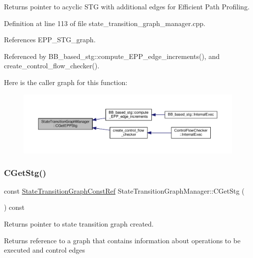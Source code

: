 Returns pointer to acyclic S\+TG with additional edges for Efficient Path Profiling. 



Definition at line 113 of file state\+\_\+transition\+\_\+graph\+\_\+manager.\+cpp.



References E\+P\+P\+\_\+\+S\+T\+G\+\_\+graph.



Referenced by B\+B\+\_\+based\+\_\+stg\+::compute\+\_\+\+E\+P\+P\+\_\+edge\+\_\+increments(), and create\+\_\+control\+\_\+flow\+\_\+checker().

Here is the caller graph for this function\+:
\nopagebreak
\begin{figure}[H]
\begin{center}
\leavevmode
\includegraphics[width=350pt]{d9/dfd/classStateTransitionGraphManager_a1bc8860568f2b3038bfd26c0b30558d8_icgraph}
\end{center}
\end{figure}
\mbox{\label{classStateTransitionGraphManager_aa4d2fce9798ca435e2366e999d368c11}} 
\subsubsection{\texorpdfstring{C\+Get\+Stg()}{CGetStg()}}
{\footnotesize\ttfamily const \hyperlink{state__transition__graph_8hpp_aa722f3ba42caaaafcacdec07925f6b06}{State\+Transition\+Graph\+Const\+Ref} State\+Transition\+Graph\+Manager\+::\+C\+Get\+Stg (\begin{DoxyParamCaption}{ }\end{DoxyParamCaption}) const}



Returns pointer to state transition graph created. 

\begin{DoxyReturn}{Returns}
reference to a graph that contains information about operations to be executed and control edges 
\end{DoxyReturn}


